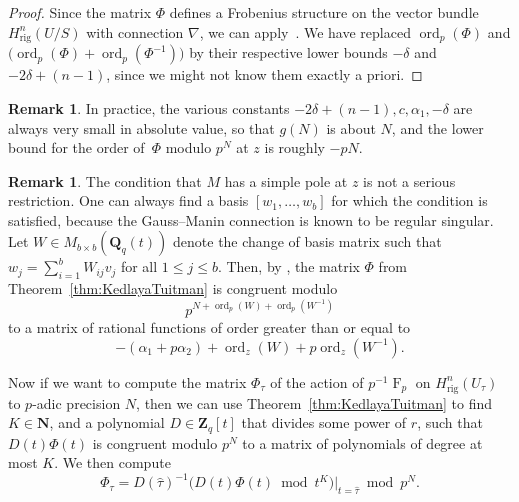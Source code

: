 \documentclass[a4paper,11pt]{article}
\numberwithin{equation}{section}
\newcommand{\NN}{\mathbf{N}} %
\newcommand{\ZZ}{\mathbf{Z}} %
\newcommand{\QQ}{\mathbf{Q}} %
\DeclareMathOperator{\ord}{ord}          %
\DeclareMathOperator{\Frob}{F}           %
\providecommand{\Hrig}{H_{\text{rig}}}  %
\theoremstyle{definition}
\newtheorem{rem}[thm]{Remark}
\begin{document}
\begin{proof}
Since the matrix $\Phi$ defines a Frobenius structure on the vector 
bundle $\Hrig^n(U/S)$ with connection $\nabla$, we can 
apply~\citep[Theorem~2.1]{KedlayaTuitman2012}. We have 
replaced $\ord_p(\Phi)$ and $ \bigl( \ord_p(\Phi)+\ord_p(\Phi^{-1}) \bigr)$ 
by their respective lower bounds $-\delta$ and $-2 \delta + (n-1)$, since 
we might not know them exactly a priori.
\end{proof}

\begin{rem}
In practice, the various constants $-2 \delta + (n-1), c, \alpha_1, -\delta$ 
are always very small in absolute value, so that $g(N)$ is about $N$, and 
the lower bound for the order of~$\Phi$ modulo $p^N$ at $z$ is roughly $-pN$.
\end{rem}

\begin{rem}
The condition that $M$ has a simple pole at $z$ is not a serious restriction. 
One can always find a basis $[w_1, \ldots, w_b]$ for which the condition is 
satisfied, because the Gauss--Manin connection is known to be regular singular. 
Let $W \in M_{b \times b}(\QQ_q(t))$ denote the change of basis matrix such 
that $w_j = \sum_{i=1}^b W_{ij} v_j$ for all $1 \leq j \leq b$. Then, 
by \citep[Corollary 2.6]{KedlayaTuitman2012}, the matrix $\Phi$ from
Theorem~\ref{thm:KedlayaTuitman} is congruent modulo 
\[
p^{N+\ord_p(W)+\ord_p(W^{-1})}
\] 
to a matrix of rational functions of order greater than 
or equal to 
\[
-(\alpha_1+p \alpha_2)+\ord_z(W)+p\ord_z(W^{-1}).
\] 
\end{rem}


Now if we want to compute the matrix $\Phi_{\tau}$ of the action of 
$p^{-1} \Frob_p$ on $\Hrig^{n}(U_{\tau})$ to $p$-adic precision $N$, 
then we can use Theorem~\ref{thm:KedlayaTuitman} to find $K \in \NN$, 
and a polynomial $D \in \ZZ_q[t]$ that divides some power of $r$, such that 
$D(t) \Phi(t)$ is congruent modulo $p^N$ to a matrix of polynomials of degree 
at most $K$. 
We then compute
\begin{equation*}
\Phi_{\tau} = D(\hat{\tau})^{-1} \bigl( D(t) \Phi(t) \bmod{t^{K}} \bigr)|_{t=\hat{\tau}} \bmod{p^{N}}.
\end{equation*}
\end{document}
